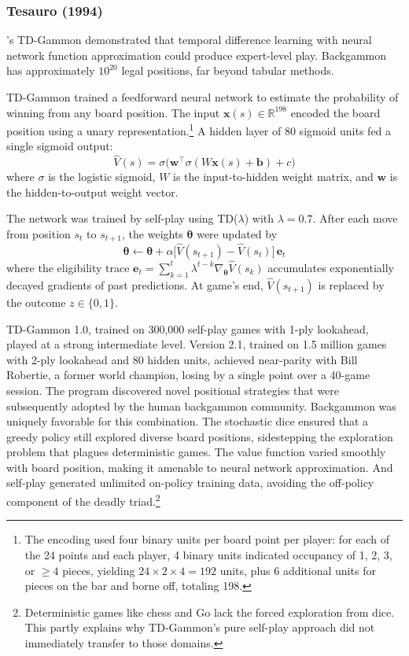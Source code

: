 \subsubsection{Tesauro (1994)}

\citet{tesauro1994}'s TD-Gammon demonstrated that temporal difference learning with neural network function approximation could produce expert-level play. Backgammon has approximately $10^{20}$ legal positions, far beyond tabular methods.

TD-Gammon trained a feedforward neural network to estimate the probability of winning from any board position. The input $\mathbf{x}(s) \in \mathbb{R}^{198}$ encoded the board position using a unary representation.\footnote{The encoding used four binary units per board point per player: for each of the 24 points and each player, 4 binary units indicated occupancy of 1, 2, 3, or $\geq 4$ pieces, yielding $24 \times 2 \times 4 = 192$ units, plus 6 additional units for pieces on the bar and borne off, totaling 198.} A hidden layer of 80 sigmoid units fed a single sigmoid output:
\begin{equation}
\hat{V}(s) = \sigma\!\bigl(\mathbf{w}^\top \sigma(W\mathbf{x}(s) + \mathbf{b}) + c\bigr)
\end{equation}
where $\sigma$ is the logistic sigmoid, $W$ is the input-to-hidden weight matrix, and $\mathbf{w}$ is the hidden-to-output weight vector.

The network was trained by self-play using TD($\lambda$) with $\lambda = 0.7$. After each move from position $s_t$ to $s_{t+1}$, the weights $\boldsymbol{\theta}$ were updated by
\begin{equation}
\boldsymbol{\theta} \leftarrow \boldsymbol{\theta} + \alpha \bigl[\hat{V}(s_{t+1}) - \hat{V}(s_t)\bigr] \, \mathbf{e}_t
\end{equation}
where the eligibility trace $\mathbf{e}_t = \sum_{k=1}^{t} \lambda^{t-k} \nabla_{\boldsymbol{\theta}} \hat{V}(s_k)$ accumulates exponentially decayed gradients of past predictions. At game's end, $\hat{V}(s_{t+1})$ is replaced by the outcome $z \in \{0, 1\}$.

TD-Gammon 1.0, trained on 300{,}000 self-play games with 1-ply lookahead, played at a strong intermediate level. Version 2.1, trained on 1.5 million games with 2-ply lookahead and 80 hidden units, achieved near-parity with Bill Robertie, a former world champion, losing by a single point over a 40-game session. The program discovered novel positional strategies that were subsequently adopted by the human backgammon community. Backgammon was uniquely favorable for this combination. The stochastic dice ensured that a greedy policy still explored diverse board positions, sidestepping the exploration problem that plagues deterministic games. The value function varied smoothly with board position, making it amenable to neural network approximation. And self-play generated unlimited on-policy training data, avoiding the off-policy component of the deadly triad.\footnote{Deterministic games like chess and Go lack the forced exploration from dice. This partly explains why TD-Gammon's pure self-play approach did not immediately transfer to those domains.}

